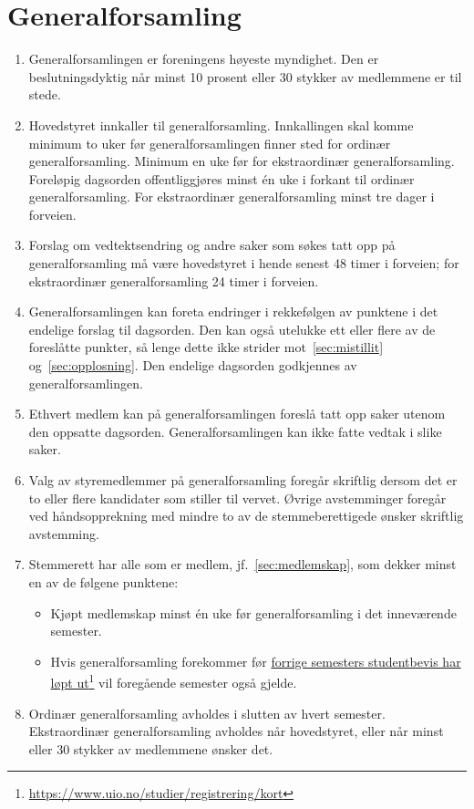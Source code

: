 \documentclass[8pt,norsk,a4paper]{article}
\newcommand\fhref[2]{%
	\href{#1}{#2}\footnote{\url{#1}}%
}
\begin{document}
\section{Generalforsamling}
\begin{enumerate}
	\item{Generalforsamlingen er foreningens høyeste myndighet. Den er beslutningsdyktig når minst 10 prosent eller 30 stykker av medlemmene er til stede.}
	\item{Hovedstyret innkaller til generalforsamling. Innkallingen skal komme minimum to uker før generalforsamlingen finner sted for ordinær generalforsamling. Minimum en uke før for ekstraordinær generalforsamling. Foreløpig dagsorden offentliggjøres minst én uke i forkant til ordinær generalforsamling. For ekstraordinær generalforsamling minst tre dager i forveien.}
	\item{Forslag om vedtektsendring og andre saker som søkes tatt opp på generalforsamling må være hovedstyret i hende senest 48 timer i forveien; for ekstraordinær generalforsamling 24 timer i forveien.}
	\item{Generalforsamlingen kan foreta endringer i rekkefølgen av punktene i det endelige forslag til dagsorden. Den kan også utelukke ett eller flere av de foreslåtte punkter, så lenge dette ikke strider mot~\ref{sec:mistillit} og~\ref{sec:opplosning}. Den endelige dagsorden godkjennes av generalforsamlingen.}
	\item{Ethvert medlem kan på generalforsamlingen foreslå tatt opp saker utenom den oppsatte dagsorden. Generalforsamlingen kan ikke fatte vedtak i slike saker.}
	\item{Valg av styremedlemmer på generalforsamling foregår skriftlig dersom det er to eller flere kandidater som stiller til vervet. Øvrige avstemminger foregår ved håndsopprekning med mindre to av de stemmeberettigede ønsker skriftlig avstemming.}
	\item{Stemmerett har alle som er medlem, jf.~\ref{sec:medlemskap}, som dekker minst en av de følgene punktene:}
	\begin{itemize}
	    \item{Kjøpt medlemskap minst én uke før generalforsamling i det inneværende semester.}
	    \item{Hvis generalforsamling forekommer før \fhref{https://www.uio.no/studier/registrering/kort}{forrige semesters studentbevis har løpt ut} vil foregående semester også gjelde.}
	\end{itemize}
	\item{Ordinær generalforsamling avholdes i slutten av hvert semester. Ekstraordinær generalforsamling avholdes når hovedstyret, eller når minst  eller 30 stykker av medlemmene ønsker det.}

\end{enumerate}
\end{document}
